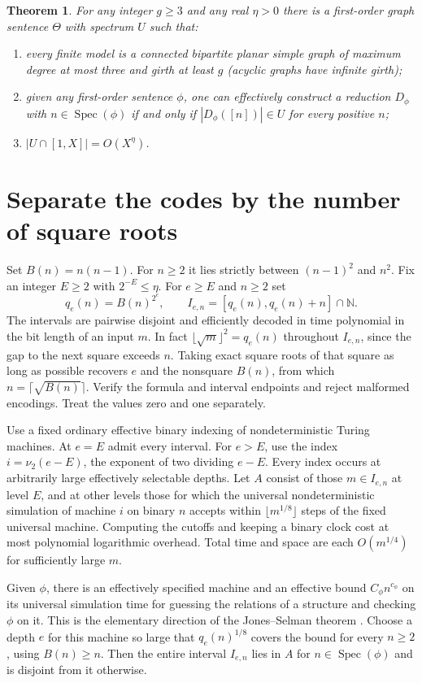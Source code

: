 \documentclass[11pt]{article}
\newtheorem{theorem}{Theorem}
\newcommand{\Spec}{\operatorname{Spec}}
\newcommand{\N}{\mathbb N}
\begin{document}
\begin{theorem}\label{main}
For any integer $g\ge3$ and any real $\eta>0$ there is a first-order graph sentence $\Theta$ with spectrum $U$ such that:
\begin{enumerate}
\item every finite model is a connected bipartite planar simple graph of maximum degree at most three and girth at least $g$ (acyclic graphs have infinite girth);
\item given any first-order sentence $\phi$, one can effectively construct a reduction $D_\phi$ with $n\in\Spec(\phi)$ if and only if $|D_\phi([n])|\in U$ for every positive $n$;
\item $|U\cap[1,X]|=O(X^\eta)$.
\end{enumerate}
\end{theorem}

\section{Separate the codes by the number of square roots}
Set $B(n)=n(n-1)$. For $n\ge2$ it lies strictly between $(n-1)^2$ and $n^2$. Fix an integer $E\ge2$ with $2^{-E}\le\eta$. For $e\ge E$ and $n\ge2$ set
\[
             q_e(n)=B(n)^{2^e},\qquad I_{e,n}=[q_e(n),q_e(n)+n]\cap\N.
\]
The intervals are pairwise disjoint and efficiently decoded in time polynomial in the bit length of an input $m$. In fact $\lfloor\sqrt m\rfloor^2=q_e(n)$ throughout $I_{e,n}$, since the gap to the next square exceeds $n$. Taking exact square roots of that square as long as possible recovers $e$ and the nonsquare $B(n)$, from which $n=\lceil\sqrt{B(n)}\rceil$. Verify the formula and interval endpoints and reject malformed encodings. Treat the values zero and one separately.

Use a fixed ordinary effective binary indexing of nondeterministic Turing machines. At $e=E$ admit every interval. For $e>E$, use the index $i=\nu_2(e-E)$, the exponent of two dividing $e-E$. Every index occurs at arbitrarily large effectively selectable depths. Let $A$ consist of those $m\in I_{e,n}$ at level $E$, and at other levels those for which the universal nondeterministic simulation of machine $i$ on binary $n$ accepts within $\lfloor m^{1/8}\rfloor$ steps of the fixed universal machine. Computing the cutoffs and keeping a binary clock cost at most polynomial logarithmic overhead. Total time and space are each $O(m^{1/4})$ for sufficiently large $m$.

Given $\phi$, there is an effectively specified machine and an effective bound $C_\phi n^{c_\phi}$ on its universal simulation time for guessing the relations of a structure and checking $\phi$ on it. This is the elementary direction of the Jones--Selman theorem \cite{js}. Choose a depth $e$ for this machine so large that $q_e(n)^{1/8}$ covers the bound for every $n\ge2$, using $B(n)\ge n$. Then the entire interval $I_{e,n}$ lies in $A$ for $n\in\Spec(\phi)$ and is disjoint from it otherwise.
\end{document}
